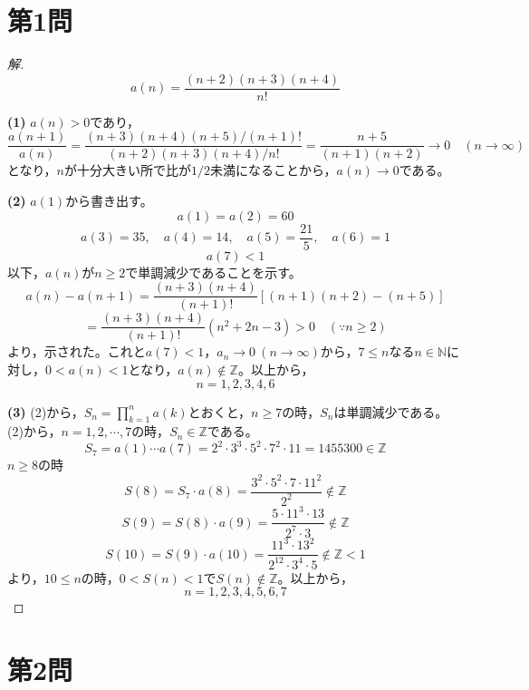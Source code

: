 \documentclass[../main.tex]{subfiles}
\begin{document}
\section*{第1問}

\begin{proof}[解]
  \[
    a(n)=\frac{(n+2)(n+3)(n+4)}{n!}
  \]

  \textbf{(1)} $a(n)>0$であり，
  \[
    \frac{a(n+1)}{a(n)}=\frac{(n+3)(n+4)(n+5)/(n+1)!}{(n+2)(n+3)(n+4)/n!}=\frac{n+5}{(n+1)(n+2)}\longrightarrow0 \quad(n\to\infty)
  \]
  となり，$n$が十分大きい所で比が$1/2$未満になることから，$a(n)\to0$である。

  \textbf{(2)} $a(1)$から書き出す。
  \[
    a(1)=a(2)=60
  \]
  \[
    a(3)=35,\quad a(4)=14,\quad a(5)=\frac{21}{5},\quad a(6)=1
  \]
  \[
    a(7)<1
  \]
  以下，$a(n)$が$n\ge2$で単調減少であることを示す。
  \[
    a(n)-a(n+1)=\frac{(n+3)(n+4)}{(n+1)!}\left[(n+1)(n+2)-(n+5)\right]
  \]
  \[
    =\frac{(n+3)(n+4)}{(n+1)!}(n^2+2n-3)>0 \quad(\because n\ge2)
  \]
  より，示された。これと$a(7)<1$，$a_n\to0\ (n\to\infty)$から，$7\le n$なる$n\in\mathbb{N}$に対し，$0<a(n)<1$となり，$a(n)\notin\mathbb{Z}$。以上から，
  \[
    n=1,2,3,4,6
  \]

  \textbf{(3)} (2)から，$S_n=\displaystyle\prod_{k=1}^na(k)$とおくと，$n\ge7$の時，$S_n$は単調減少である。(2)から，$n=1,2,\cdots,7$の時，$S_n\in\mathbb{Z}$である。
  \[
    S_7=a(1)\cdots a(7)=2^2\cdot3^3\cdot5^2\cdot7^2\cdot11=1455300\in\mathbb{Z}
  \]
  $n\ge8$の時
  \[
    S(8)=S_7\cdot a(8)=\frac{3^2\cdot5^2\cdot7\cdot11^2}{2^2}\notin\mathbb{Z}
  \]
  \[
    S(9)=S(8)\cdot a(9)=\frac{5\cdot11^3\cdot13}{2^7\cdot3}\notin\mathbb{Z}
  \]
  \[
    S(10)=S(9)\cdot a(10)=\frac{11^3\cdot13^2}{2^{12}\cdot3^4\cdot5}\notin\mathbb{Z}<1
  \]
  より，$10\le n$の時，$0<S(n)<1$で$S(n)\notin\mathbb{Z}$。以上から，
  \[
    n=1,2,3,4,5,6,7
  \]
\end{proof}

\newpage

\section*{第2問}
\end{document}
